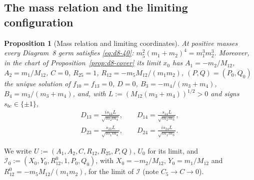 \documentclass[11pt]{amsart}
\newtheorem{proposition}[theorem]{Proposition}
\theoremstyle{definition}
\theoremstyle{remark}
\begin{document}
\subsection{The mass relation and the limiting configuration}

\begin{proposition}[Mass relation and limiting coordinates]\label{prop:d8-first}
At positive masses every Diagram~8 germ satisfies \eqref{eq:d8-40}:
$m_5^2(m_1+m_2)^4=m_1^3m_2^3$.  Moreover, in the chart of Proposition~\ref{prop:d8-cover} its
limit $x_0$ has $A_1=-m_2/M_{12}$, $A_2=m_1/M_{12}$, $C=0$, $R_{25}=1$,
$R_{12}=-m_5M_{12}/(m_1m_2)$, $(P,Q)=(P_0,Q_0)$ the unique solution of $f_{10}=f_{13}=0$,
$D=0$, $B_3=-m_4/(m_3+m_4)$, $B_4=m_3/(m_3+m_4)$, and, with $L:=(M_{12}(m_3+m_4))^{1/2}>0$ and
signs $s_{bc}\in\{\pm1\}$,
\begin{gather*}
  D_{13}=\frac{is_{13}L}{\sqrt{m_2m_4}},\qquad D_{14}=\frac{s_{14}L}{\sqrt{m_2m_3}},\\
  D_{23}=\frac{s_{23}L}{\sqrt{m_1m_4}},\qquad D_{24}=\frac{is_{24}L}{\sqrt{m_1m_3}}.
\end{gather*}
\end{proposition}
We write $U:=(A_1,A_2,C,R_{12},R_{25},P,Q)$, $U_0$ for its limit, and
$\mathcal I_0:=(X_0,Y_0,R_{12}^0,1,P_0,Q_0)$, with $X_0=-m_2/M_{12}$, $Y_0=m_1/M_{12}$ and
$R_{12}^0=-m_5M_{12}/(m_1m_2)$, for the limit of $\mathcal I$ (note $C_5\to C\to0$).
\end{document}
